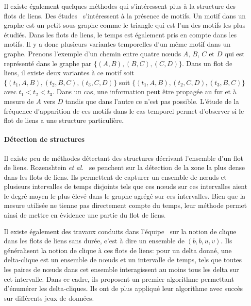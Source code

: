 Il existe également quelques méthodes qui s'intéressent plus à la structure des flots de liens.
Des études~\cite{Kovanen2011a,Kovanen2013a} s'intéressent à la présence de motifs.
Un motif dans un graphe est un petit sous-graphe comme le triangle qui est l'un des motifs les plus étudiés.
Dans les flots de liens, le temps est également pris en compte dans les motifs.
Il y a donc plusieurs variantes temporelles d'un même motif dans un graphe.
Prenons l'exemple d'un chemin entre quatre n\oe{}uds $A$, $B$, $C$ et $D$ qui est représenté dans le graphe par  $\{(A,B), (B,C), (C,D)\}$.
Dans un flot de liens, il existe deux variantes à ce motif soit
$\{(t_1,A,B), (t_2,B,C), (t_3,C,D)\}$ soit $\{(t_1,A,B), (t_2,C,D), (t_3,B,C)\}$ avec $t_1<t_2<t_3$.
Dans un cas,  une information peut être propagée au fur et à mesure de $A$ vers $D$ tandis que dans l'autre ce n'est pas possible.
L'étude de la fréquence d'apparition de ces motifs dans le cas temporel permet d'observer si le flot de liens a une structure particulière. 



\paragraph{Détection de structures}
Il existe peu de méthodes détectant des structures décrivant l'ensemble d'un flot de liens.
Rozenshtein \emph{et al.}~\cite{rozenshtein2014} se penchent sur la détection de la zone la plus dense dans les flots de liens.
Ils permettent de capturer un ensemble de n\oe{}uds et plusieurs intervalles de temps disjoints tels que ces n\oe{}uds sur ces intervalles aient le degré moyen le plus élevé dans le graphe agrégé sur ces intervalles.
Bien que la mesure utilisée ne tienne pas directement compte du temps, leur méthode permet ainsi de mettre en évidence une partie du flot de liens.

Il existe également des travaux conduits dans l'équipe~\cite{Viard2016,viard:hal-01208330} sur la notion de clique  dans les flots de liens sans durée, c'est à dire un ensemble de $(b,b,u,v)$.
Ils généralisent la notion de clique à ces flots de liens: pour un delta donné, une delta-clique est un ensemble de n\oe{}uds et un intervalle de temps, tels que toutes les paires de n\oe{}uds dans cet ensemble interagissent au moins tous les delta sur cet intervalle.
Dans ce cadre, ils proposent un premier algorithme permettant d’énumérer les delta-cliques.
Ils ont de plus appliqué leur algorithme avec succès sur différents jeux de données.



